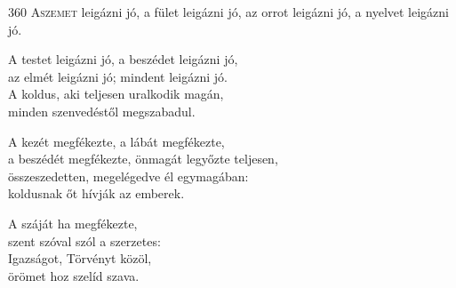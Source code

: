 
\begin{firstdhpverse}[-2pt]{360}
\lettrine[slope=0.5em]{A}{szemet} {\LettrineTextFont leigázni jó,}\newline
a fület leigázni jó,\newline
az orrot leigázni jó,\newline
a nyelvet leigázni jó.
\end{firstdhpverse}

\begin{dhpverse}

 A testet leigázni jó, a beszédet leigázni jó,\\
az elmét leigázni jó; mindent leigázni jó.\\
A koldus, aki teljesen uralkodik magán,\\
minden szenvedéstől megszabadul.

 A kezét megfékezte, a lábát megfékezte,\\
a beszédét megfékezte, önmagát legyőzte teljesen,\\
összeszedetten, megelégedve él egymagában:\\
koldusnak őt hívják az emberek.

 A száját ha megfékezte,\\
szent szóval szól a szerzetes:\\
Igazságot, Törvényt közöl,\\
örömet hoz szelíd szava.

\end{dhpverse}
\newpage
